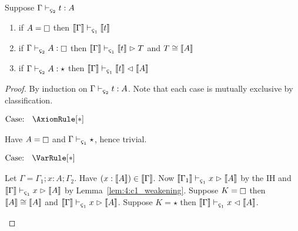 \begin{theorem}
    \label{lem:4:soudness}
    Suppose $\Gamma \vdash_{\ced} t : A$
    \begin{enumerate}
        \item if $A = \kind$ then $\sema{\Gamma} \vdash_{\oldced} \sema{t}$
        \item if $\Gamma \vdash_{\ced} A : \kind$ then $\sema{\Gamma} \vdash_{\oldced} \sema{t} \infr T$ and $T \cong \llbracket A \rrbracket$
        \item if $\Gamma \vdash_{\ced} A : \star$ then $\sema{\Gamma} \vdash_{\oldced} \sema{t} \chck \sema{A}$
    \end{enumerate}
\end{theorem}
\begin{proof}
    By induction on $\Gamma \vdash_{\ced} t : A$.
    Note that each case is mutually exclusive by classification.

    $\text{Case: }\begin{array}{c} \AxiomRule[*] \end{array}$
    \begin{proofcase}
        Have $A = \kind$ and $\Gamma \vdash_{\oldced} \star$, hence trivial.
    \end{proofcase}

    $\text{Case: }\begin{array}{c} \VarRule[*] \end{array}$
    \begin{proofcase}
        Let $\Gamma = \Gamma_1; x : A; \Gamma_2$.
        Have $(x : \llbracket A \rrbracket) \in \llbracket \Gamma \rrbracket$.
        Now $\sema{\Gamma_1} \vdash_{\oldced} x \infr \sema{A}$ by the IH and $\sema{\Gamma} \vdash_{\oldced} x \infr \sema{A}$ by Lemma~\ref{lem:4:c1_weakening}.
        Suppose $K = \kind$ then $\llbracket A \rrbracket \cong \llbracket A \rrbracket$ and $\sema{\Gamma} \vdash_{\oldced} x \infr \sema{A}$.
        Suppose $K = \star$ then $\sema{\Gamma} \vdash_{\oldced} x \chck \sema{A}$.
    \end{proofcase}


\end{proof}
